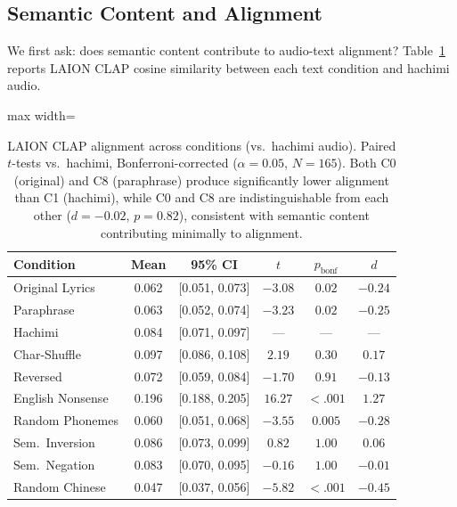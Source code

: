 \documentclass[11pt]{article}
\begin{document}
\subsection{Semantic Content and Alignment}\label{sec:semantic}

We first ask: does semantic content contribute to audio-text alignment? Table~\ref{tab:alignment} reports LAION CLAP cosine similarity between each text condition and hachimi audio.

\begin{table}[!t]
\centering
\caption{LAION CLAP alignment across conditions (vs.\ hachimi audio). Paired $t$-tests vs.\ hachimi, Bonferroni-corrected ($\alpha{=}0.05$, $N{=}165$). Both C0 (original) and C8 (paraphrase) produce significantly lower alignment than C1 (hachimi), while C0 and C8 are indistinguishable from each other ($d{=}{-}0.02$, $p{=}0.82$), consistent with semantic content contributing minimally to alignment.}
\label{tab:alignment}
\small
\begin{adjustbox}{max width=\columnwidth}
\begin{tabular}{l c c c c c}
\toprule
\textbf{Condition} & \textbf{Mean} & \textbf{95\% CI} & $t$ & $p_{\text{bonf}}$ & $d$ \\
\midrule
Original Lyrics    & 0.062 & [0.051, 0.073] & $-3.08$ & $0.02$ & $-0.24$ \\
Paraphrase         & 0.063 & [0.052, 0.074] & $-3.23$ & $0.02$ & $-0.25$ \\
Hachimi            & 0.084 & [0.071, 0.097] & ---    & ---    & ---    \\
Char-Shuffle       & 0.097 & [0.086, 0.108] & $2.19$  & $0.30$ & $0.17$ \\
Reversed           & 0.072 & [0.059, 0.084] & $-1.70$ & $0.91$ & $-0.13$ \\
English Nonsense   & 0.196 & [0.188, 0.205] & $16.27$ & ${<}.001$ & $1.27$ \\
Random Phonemes    & 0.060 & [0.051, 0.068] & $-3.55$ & $0.005$ & $-0.28$ \\
Sem.\ Inversion    & 0.086 & [0.073, 0.099] & $0.82$  & $1.00$ & $0.06$ \\
Sem.\ Negation     & 0.083 & [0.070, 0.095] & $-0.16$ & $1.00$ & $-0.01$ \\
Random Chinese     & 0.047 & [0.037, 0.056] & $-5.82$ & ${<}.001$ & $-0.45$ \\
\bottomrule
\end{tabular}
\end{adjustbox}
\end{table}
\end{document}

